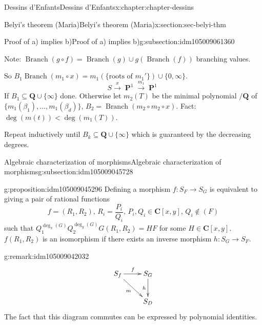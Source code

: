 \documentclass[oneside,10pt,]{book}
\numberwithin{equation}{section}
\newcommand{\lb}{[}
\newcommand{\rb}{]}
\newcommand{\QQ}{\mathbf{Q}}
\newcommand{\CC}{\mathbf{C}}
\DeclareMathOperator{\PP}{\mathbf{P}}
\newcommand{\lt}{<}
\begin{document}
\begin{chapterptx}{Dessins d'Enfants}{}{Dessins d'Enfants}{}{}{x:chapter:chapter-dessins}
\begin{sectionptx}{Belyi's theorem (Maria)}{}{Belyi's theorem (Maria)}{}{}{x:section:sec-belyi-thm}
\begin{subsectionptx}{Proof of a) implies b)}{}{Proof of a) implies b)}{}{}{g:subsection:idm105009061360}
\par
Note: \(\operatorname{Branch}(g\circ f) = \operatorname{Branch}(g) \cup g(\operatorname{Branch}(f))\) branching values.%
\par
So \(B_1 \operatorname{Branch}(m_1 \circ x) = m_1(\{\text{roots of }m_1'\}) \cup\{0,\infty\}\).%
\begin{equation*}
S\xrightarrow x \PP^1 \xrightarrow{m_1} \PP^1
\end{equation*}
If \(B_1 \subseteq \QQ \cup \{\infty\}\) done. Otherwise let \(m_2(T) \) be the minimal polynomial \(/\QQ\) of \(\{m_1(\beta_1) ,\ldots, m_1(\beta_d) \}\), \(B_2 = \operatorname{Branch}(m_2\circ m_2 \circ x)\). Fact: \(\deg(m(t)) \lt \deg(m_1(T))\).%
\par
Repeat inductively until \(B_k \subseteq \QQ \cup \{\infty\}\) which is guaranteed by the decreasing degrees.%
\end{subsectionptx}
%
%
\typeout{************************************************}
\typeout{************************************************}
%
\begin{subsectionptx}{Algebraic characterization of morphisms}{}{Algebraic characterization of morphisms}{}{}{g:subsection:idm105009045728}
\begin{proposition}{}{}{g:proposition:idm105009045296}%
Defining a morphism \(f \colon S_F\to S_G\) is equivalent to giving a pair of rational functions%
\begin{equation*}
f=  (R_1, R_2),\,R_i= \frac{P_i}{Q_i},\,    P_i,Q_i\in \CC[x,y],\,Q_i\not\in (F)
\end{equation*}
such that \(Q_1^{\deg_x(G)}Q_2^{\deg_y(G)} G(R_1, R_2) = HF\) for some \(H \in \CC\lb x, y\rb\). \(f(R_1, R_2)\) is an isomorphism if there exists an inverse morphism \(h\colon S_G\to S_F\).%
\end{proposition}
\begin{remark}{}{g:remark:idm105009042032}%
%
\begin{equation*}
\xymatrix{
S_f \ar[r]^f \ar[dr]_m & S_G \ar[d]_h \\
& S_D
}
\end{equation*}
The fact that this diagram commutes can be expressed by polynomial identities.%
\end{remark}
\end{subsectionptx}
%
%
\typeout{************************************************}
\typeout{************************************************}

\end{sectionptx}
\end{chapterptx}
\end{document}
